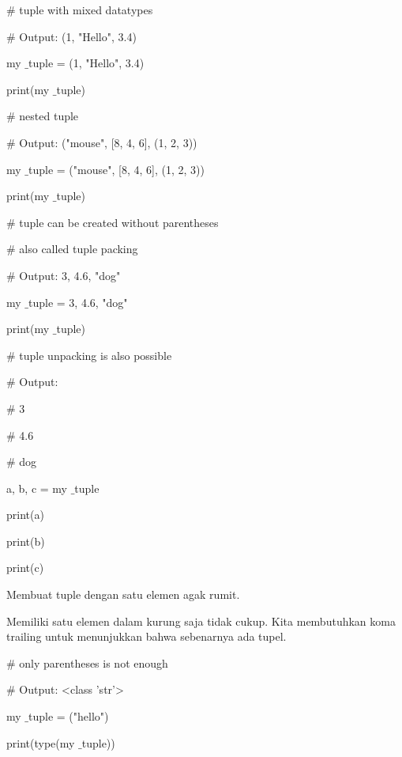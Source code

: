  $  \#  $ tuple with mixed datatypes \par
 $  \#  $ Output: (1, "Hello", 3.4) \par
my $  \_  $tuple = (1, "Hello", 3.4) \par
print(my $  \_  $tuple) \par
\vspace{12pt}
 $  \#  $ nested tuple \par
 $  \#  $ Output: ("mouse", [8, 4, 6], (1, 2, 3)) \par
my $  \_  $tuple = ("mouse", [8, 4, 6], (1, 2, 3)) \par
print(my $  \_  $tuple) \par
\vspace{12pt}
 $  \#  $ tuple can be created without parentheses \par
 $  \#  $ also called tuple packing \par
 $  \#  $ Output: 3, 4.6, "dog" \par
\vspace{12pt}
my $  \_  $tuple = 3, 4.6, "dog" \par
print(my $  \_  $tuple) \par
\vspace{12pt}
 $  \#  $ tuple unpacking is also possible \par
 $  \#  $ Output: \par
 $  \#  $ 3 \par
 $  \#  $ 4.6 \par
 $  \#  $ dog \par
a, b, c = my $  \_  $tuple \par
print(a) \par
print(b) \par
print(c) \par
\vspace{12pt}
Membuat tuple dengan satu elemen agak rumit. \par
\vspace{12pt}
Memiliki satu elemen dalam kurung saja tidak cukup. Kita membutuhkan koma trailing untuk menunjukkan bahwa sebenarnya ada tupel. \par
\vspace{12pt}
 $  \#  $ only parentheses is not enough \par
 $  \#  $ Output: <class 'str'> \par
my $  \_  $tuple = ("hello") \par
print(type(my $  \_  $tuple)) \par
\vspace{12pt}
